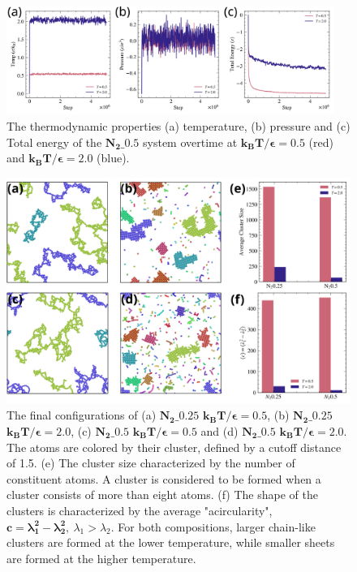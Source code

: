 \documentclass[10pt,a4paper]{labreport}
\begin{document}
\begin{figure}[p]
  \centering
  \includegraphics[width = 0.95\textwidth]{figs/ass3_Nx0.5_thermos.png}
  \caption{The thermodynamic properties (a) temperature, (b) pressure and (c) Total energy of the $\bm{N_2\_ 0.5}$ system overtime at $\bm{k_BT / \epsilon = 0.5}$ (red) and $\bm{k_BT/\epsilon = 2.0}$ (blue). } 
  \label{fig:ass3_Nx0.5_thermos}
\end{figure}
\begin{figure}[p]
  \centering
  \includegraphics[width = \textwidth]{figs/ass3_results.png}
  \caption{The final configurations of (a) $\bm{N_2\_0.25}$ $\bm{k_BT / \epsilon = 0.5}$, (b)  $\bm{N_2\_0.25}$ $\bm{k_BT / \epsilon = 2.0}$,  (c) $\bm{N_2\_0.5}$ $\bm{k_BT / \epsilon = 0.5}$ and (d) $\bm{N_2\_0.5}$ $\bm{k_BT / \epsilon = 2.0}$. The atoms are colored by their cluster, defined by a cutoff distance of 1.5. (e) The cluster size characterized by the number of constituent atoms. A cluster is considered to be formed when a cluster consists of more than eight atoms. (f) The shape of the clusters is characterized by the average "acircularity", $\bm{c = \lambda_1^2 - \lambda_2^2}, ~ \lambda_1 > \lambda_2$. For both compositions, larger chain-like clusters are formed at the lower temperature, while smaller sheets are formed at the higher temperature.} 
  \label{fig:ass3_results}
\end{figure}
\end{document}
